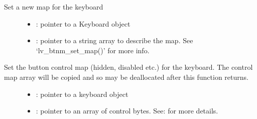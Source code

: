\documentclass[letterpaper,10pt,english]{sphinxmanual}
\begin{document}
\begin{fulllineitems}
\label{\detokenize{object-types/kb:_CPPv413lv_kb_set_mapP8lv_obj_tA_PKc}}%
\pysigstartmultiline
{}\label{\detokenize{object-types/kb:lv__kb_8h_1a3ca28669ab8c3c249e8c243beac60f0b}}%
\pysigstopmultiline
Set a new map for the keyboard \begin{description}
\item[{}] \leavevmode\begin{itemize}
\item {} 
: pointer to a Keyboard object 

\item {} 
: pointer to a string array to describe the map. See ‘lv\_btnm\_set\_map()’ for more info. 

\end{itemize}

\end{description}


\end{fulllineitems}


\begin{fulllineitems}
\label{\detokenize{object-types/kb:_CPPv418lv_kb_set_ctrl_mapP8lv_obj_tA_K14lv_btnm_ctrl_t}}%
\pysigstartmultiline
{}\label{\detokenize{object-types/kb:lv__kb_8h_1a016d19e7d4e49734af4ad72b02f8b446}}%
\pysigstopmultiline
Set the button control map (hidden, disabled etc.) for the keyboard. The control map array will be copied and so may be deallocated after this function returns. \begin{description}
\item[{}] \leavevmode\begin{itemize}
\item {} 
: pointer to a keyboard object 

\item {} 
: pointer to an array of  control bytes. See:  for more details. 

\end{itemize}

\end{description}


\end{fulllineitems}
\end{document}
